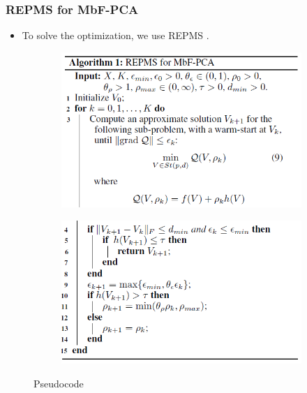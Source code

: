 \documentclass{beamer}
\begin{document}
\begin{frame}
	\frametitle{REPMS for MbF-PCA}
	\begin{itemize}
		\item To solve the optimization, we use REPMS \cite{repms}.
	\end{itemize}
	
	\begin{figure}[!t]
	\begin{center}
		\begin{subfigure}[t]{0.49\linewidth}
			\includegraphics[width=\linewidth]{mbfpca-1}
		\end{subfigure}\hfill
		\begin{subfigure}[t]{0.49\linewidth}
			\includegraphics[width=\linewidth]{mbfpca-2}
		\end{subfigure}
		\caption{\label{alg:mbfpca} Pseudocode}
	\end{center}
\end{figure}
\end{frame}
\end{document}
